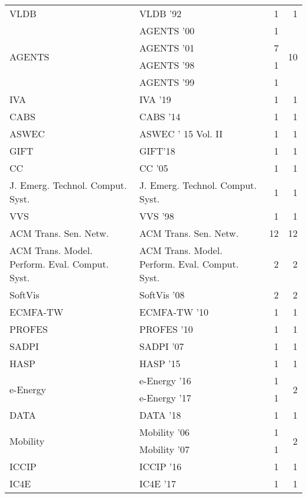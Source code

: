 \begin{table*}[t]
\begin{tabular}{llrr}
\multirow{1}{*}{VLDB } & VLDB '92 & 1 & \multirow{1}{*}{1}\\
\multirow{4}{*}{AGENTS } & AGENTS '00 & 1 & \multirow{4}{*}{10}\\
& AGENTS '01 & 7 &\\
& AGENTS '98 & 1 &\\
& AGENTS '99 & 1 &\\
\multirow{1}{*}{IVA } & IVA '19 & 1 & \multirow{1}{*}{1}\\
\multirow{1}{*}{CABS } & CABS '14 & 1 & \multirow{1}{*}{1}\\
\multirow{1}{*}{ASWEC } & ASWEC ' 15 Vol. II & 1 & \multirow{1}{*}{1}\\
\multirow{1}{*}{GIFT} & GIFT'18 & 1 & \multirow{1}{*}{1}\\
\multirow{1}{*}{CC } & CC '05 & 1 & \multirow{1}{*}{1}\\
\multirow{1}{*}{J. Emerg. Technol. Comput. Syst.} & J. Emerg. Technol. Comput. Syst. & 1 & \multirow{1}{*}{1}\\
\multirow{1}{*}{VVS } & VVS '98 & 1 & \multirow{1}{*}{1}\\
\multirow{1}{*}{ACM Trans. Sen. Netw.} & ACM Trans. Sen. Netw. & 12 & \multirow{1}{*}{12}\\
\multirow{1}{*}{ACM Trans. Model. Perform. Eval. Comput. Syst.} & ACM Trans. Model. Perform. Eval. Comput. Syst. & 2 & \multirow{1}{*}{2}\\
\multirow{1}{*}{SoftVis } & SoftVis '08 & 2 & \multirow{1}{*}{2}\\
\multirow{1}{*}{ECMFA-TW } & ECMFA-TW '10 & 1 & \multirow{1}{*}{1}\\
\multirow{1}{*}{PROFES } & PROFES '10 & 1 & \multirow{1}{*}{1}\\
\multirow{1}{*}{SADPI } & SADPI '07 & 1 & \multirow{1}{*}{1}\\
\multirow{1}{*}{HASP } & HASP '15 & 1 & \multirow{1}{*}{1}\\
\multirow{2}{*}{e-Energy } & e-Energy '16 & 1 & \multirow{2}{*}{2}\\
& e-Energy '17 & 1 &\\
\multirow{1}{*}{DATA } & DATA '18 & 1 & \multirow{1}{*}{1}\\
\multirow{2}{*}{Mobility } & Mobility '06 & 1 & \multirow{2}{*}{2}\\
& Mobility '07 & 1 &\\
\multirow{1}{*}{ICCIP } & ICCIP '16 & 1 & \multirow{1}{*}{1}\\
\multirow{1}{*}{IC4E } & IC4E '17 & 1 & \multirow{1}{*}{1}\\

\end{tabular}
\end{table*}
